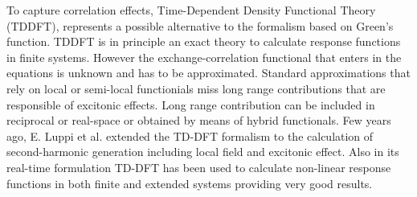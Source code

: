 To capture correlation effects, Time-Dependent Density Functional Theory (TDDFT)\cite{PhysRevLett.52.997}, represents a possible alternative to the formalism based on Green's function. TDDFT is in principle an exact theory to calculate response functions in finite systems. However the exchange-correlation functional that enters in the equations is unknown and has to be approximated. Standard approximations that rely on local or semi-local functionials miss long range contributions that are responsible of excitonic effects\cite{botti2007time}. Long range contribution can be included in reciprocal or real-space or obtained by means of hybrid functionals.\cite{botti2007time} Few years ago, E. Luppi et al. extended the TD-DFT formalism to the calculation of second-harmonic generation including local field and excitonic effect.\cite{PhysRevB.82.235201} 
Also in its real-time formulation TD-DFT has been used to calculate non-linear response functions in both finite and extended systems providing very good results.\cite{takimoto:154114,andrade2007time} 
